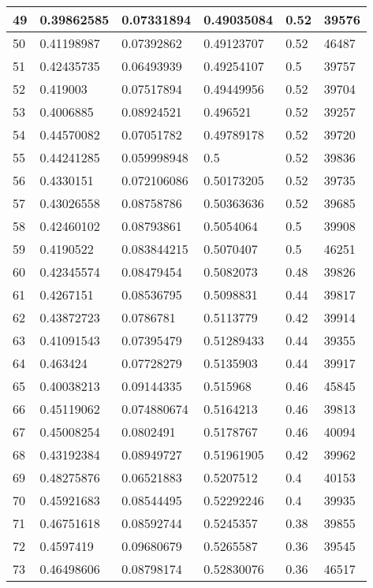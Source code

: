 \begin{longtable}{|l|l|l|l|l|l|}
49 & 0.39862585 & 0.07331894 & 0.49035084 & 0.52 & 39576 \\ \hline 
50 & 0.41198987 & 0.07392862 & 0.49123707 & 0.52 & 46487 \\ \hline 
51 & 0.42435735 & 0.06493939 & 0.49254107 & 0.5 & 39757 \\ \hline 
52 & 0.419003 & 0.07517894 & 0.49449956 & 0.52 & 39704 \\ \hline 
53 & 0.4006885 & 0.08924521 & 0.496521 & 0.52 & 39257 \\ \hline 
54 & 0.44570082 & 0.07051782 & 0.49789178 & 0.52 & 39720 \\ \hline 
55 & 0.44241285 & 0.059998948 & 0.5 & 0.52 & 39836 \\ \hline 
56 & 0.4330151 & 0.072106086 & 0.50173205 & 0.52 & 39735 \\ \hline 
57 & 0.43026558 & 0.08758786 & 0.50363636 & 0.52 & 39685 \\ \hline 
58 & 0.42460102 & 0.08793861 & 0.5054064 & 0.5 & 39908 \\ \hline 
59 & 0.4190522 & 0.083844215 & 0.5070407 & 0.5 & 46251 \\ \hline 
60 & 0.42345574 & 0.08479454 & 0.5082073 & 0.48 & 39826 \\ \hline 
61 & 0.4267151 & 0.08536795 & 0.5098831 & 0.44 & 39817 \\ \hline 
62 & 0.43872723 & 0.0786781 & 0.5113779 & 0.42 & 39914 \\ \hline 
63 & 0.41091543 & 0.07395479 & 0.51289433 & 0.44 & 39355 \\ \hline 
64 & 0.463424 & 0.07728279 & 0.5135903 & 0.44 & 39917 \\ \hline 
65 & 0.40038213 & 0.09144335 & 0.515968 & 0.46 & 45845 \\ \hline 
66 & 0.45119062 & 0.074880674 & 0.5164213 & 0.46 & 39813 \\ \hline 
67 & 0.45008254 & 0.0802491 & 0.5178767 & 0.46 & 40094 \\ \hline 
68 & 0.43192384 & 0.08949727 & 0.51961905 & 0.42 & 39962 \\ \hline 
69 & 0.48275876 & 0.06521883 & 0.5207512 & 0.4 & 40153 \\ \hline 
70 & 0.45921683 & 0.08544495 & 0.52292246 & 0.4 & 39935 \\ \hline 
71 & 0.46751618 & 0.08592744 & 0.5245357 & 0.38 & 39855 \\ \hline 
72 & 0.4597419 & 0.09680679 & 0.5265587 & 0.36 & 39545 \\ \hline 
73 & 0.46498606 & 0.08798174 & 0.52830076 & 0.36 & 46517 \\ \hline 

\end{longtable}
